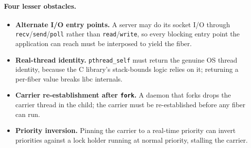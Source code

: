 \paragraph{Four lesser obstacles.}
\begin{itemize}[leftmargin=1.4em,itemsep=2pt,topsep=2pt]
  \item \textbf{Alternate I/O entry points.} A server may do its socket I/O through
    \texttt{recv}/\texttt{send}/\texttt{poll} rather than \texttt{read}/\texttt{write}, so every
    blocking entry point the application can reach must be interposed to yield the fiber.
  \item \textbf{Real-thread identity.} \texttt{pthread\_self} must return the genuine OS thread
    identity, because the C library's stack-bounds logic relies on it; returning a per-fiber value
    breaks libc internals.
  \item \textbf{Carrier re-establishment after \texttt{fork}.} A daemon that forks drops the carrier
    thread in the child; the carrier must be re-established before any fiber can run.
  \item \textbf{Priority inversion.} Pinning the carrier to a real-time priority can invert priorities
    against a lock holder running at normal priority, stalling the carrier.
\end{itemize}
